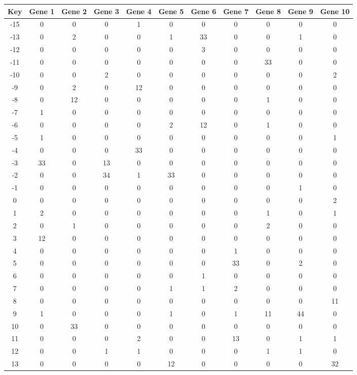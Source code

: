 \begin{tabular}{|c|c|c|c|c|c|c|c|c|c|c|}
\hline
Key & Gene 1 & Gene 2 & Gene 3 & Gene 4 & Gene 5 & Gene 6 & Gene 7 & Gene 8 & Gene 9 & Gene 10 \\
\hline
-15 & 0 & 0 & 0 & 1 & 0 & 0 & 0 & 0 & 0 & 0 \\
-13 & 0 & 2 & 0 & 0 & 1 & 33 & 0 & 0 & 1 & 0 \\
-12 & 0 & 0 & 0 & 0 & 0 & 3 & 0 & 0 & 0 & 0 \\
-11 & 0 & 0 & 0 & 0 & 0 & 0 & 0 & 33 & 0 & 0 \\
-10 & 0 & 0 & 2 & 0 & 0 & 0 & 0 & 0 & 0 & 2 \\
-9 & 0 & 2 & 0 & 12 & 0 & 0 & 0 & 0 & 0 & 0 \\
-8 & 0 & 12 & 0 & 0 & 0 & 0 & 0 & 1 & 0 & 0 \\
-7 & 1 & 0 & 0 & 0 & 0 & 0 & 0 & 0 & 0 & 0 \\
-6 & 0 & 0 & 0 & 0 & 2 & 12 & 0 & 1 & 0 & 0 \\
-5 & 1 & 0 & 0 & 0 & 0 & 0 & 0 & 0 & 0 & 1 \\
-4 & 0 & 0 & 0 & 33 & 0 & 0 & 0 & 0 & 0 & 0 \\
-3 & 33 & 0 & 13 & 0 & 0 & 0 & 0 & 0 & 0 & 0 \\
-2 & 0 & 0 & 34 & 1 & 33 & 0 & 0 & 0 & 0 & 0 \\
-1 & 0 & 0 & 0 & 0 & 0 & 0 & 0 & 0 & 1 & 0 \\
0 & 0 & 0 & 0 & 0 & 0 & 0 & 0 & 0 & 0 & 2 \\
1 & 2 & 0 & 0 & 0 & 0 & 0 & 0 & 1 & 0 & 1 \\
2 & 0 & 1 & 0 & 0 & 0 & 0 & 0 & 2 & 0 & 0 \\
3 & 12 & 0 & 0 & 0 & 0 & 0 & 0 & 0 & 0 & 0 \\
4 & 0 & 0 & 0 & 0 & 0 & 0 & 1 & 0 & 0 & 0 \\
5 & 0 & 0 & 0 & 0 & 0 & 0 & 33 & 0 & 2 & 0 \\
6 & 0 & 0 & 0 & 0 & 0 & 1 & 0 & 0 & 0 & 0 \\
7 & 0 & 0 & 0 & 0 & 1 & 1 & 2 & 0 & 0 & 0 \\
8 & 0 & 0 & 0 & 0 & 0 & 0 & 0 & 0 & 0 & 11 \\
9 & 1 & 0 & 0 & 0 & 1 & 0 & 1 & 11 & 44 & 0 \\
10 & 0 & 33 & 0 & 0 & 0 & 0 & 0 & 0 & 0 & 0 \\
11 & 0 & 0 & 0 & 2 & 0 & 0 & 13 & 0 & 1 & 1 \\
12 & 0 & 0 & 1 & 1 & 0 & 0 & 0 & 1 & 1 & 0 \\
13 & 0 & 0 & 0 & 0 & 12 & 0 & 0 & 0 & 0 & 32 \\
\hline
\end{tabular}